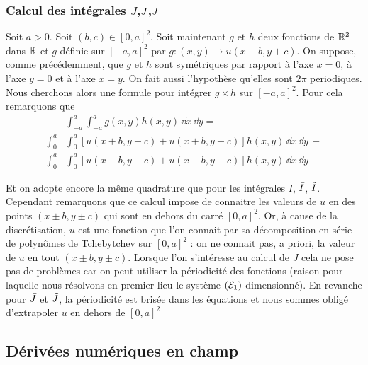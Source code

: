 \documentclass[10.5pt]{article}
\begin{document}
\begin{multicols}{2}
\vspace*{11pt}




\subsubsection{Calcul des intégrales $J$,$\bar{J}$,$\tilde{J}$ }

Soit $a>0$. Soit $(b,c) \in [0,a]^2$. Soit maintenant $g$ et $h$ deux fonctions de $\mathbb{R}^2$ dans $\mathbb{R}$ et  $g$ définie sur $[-a, a]^2$  par $g : (x,y) \rightarrow u(x+b, y+c)$. On suppose, comme précédemment, que $g$ et $h$ sont symétriques par rapport à l'axe $x=0$, à l'axe $y=0$ et à l'axe $x=y$. On fait aussi l'hypothèse qu'elles sont $2\pi$ periodiques. Nous cherchons alors une formule pour intégrer $g\times h$ sur $[-a, a]^2$. Pour cela remarquons que
\begin{equation}
\begin{split}
 & \int_{-a}^{a} \int_{-a}^{a} g(x,y) h(x,y) \,  \dd x \, \dd y  = \\
 \int_{0}^{a} & \int_{0}^{a} [u(x+b, y+c) + u(x+b, y-c)] h(x,y) \, \dd x \, \dd y \, + \\ 
\int_{0}^{a} & \int_{0}^{a} [u(x-b, y+c) + u(x-b, y-c)] h(x,y)  \, \dd x \, \dd y 
\end{split}
\end{equation}

Et on adopte encore la même quadrature que pour les intégrales $I$, $\bar{I}$, $\tilde{I}$. Cependant remarquons que ce calcul impose de connaitre les valeurs de $u$ en des points $(x \pm b, y\pm c)$ qui sont en dehors du carré $[0, a]^2$. Or, à cause de la discrétisation, $u$ est une fonction que l'on connait par sa décomposition en série de polynômes de Tchebytchev sur $[0,a]^2$ : on ne connait pas, a priori, la valeur de $u$ en tout $(x\pm b, y\pm c)$. Lorsque l'on s'intéresse au calcul de $J$ cela ne pose pas de problèmes car on peut utiliser la périodicité des fonctions (raison pour laquelle nous résolvons en premier lieu le système $(\mathcal{E}_1)$ dimensionné). En revanche pour $\bar{J}$ et $\tilde{J}$, la périodicité est brisée dans les équations et nous sommes obligé d'extrapoler $u$ en dehors de $[0,a]^2$





\subsection{Dérivées numériques en champ }


\end{multicols}
\end{document}
